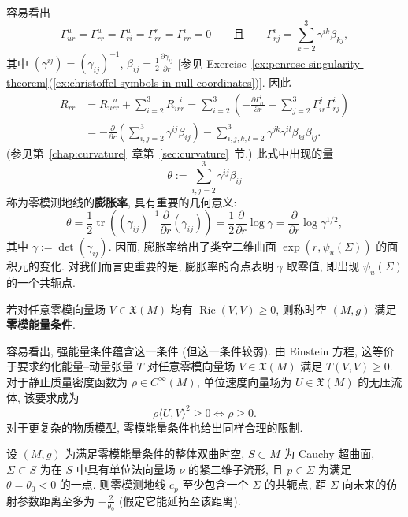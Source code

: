 容易看出
\[
  \Gamma^u_{ur}=\Gamma^u_{rr}=\Gamma^u_{ri}=\Gamma^r_{rr}=\Gamma^i_{rr}=0
  \qquad\text{且}\qquad\Gamma^i_{rj}=\sum_{k=2}^3\gamma^{ik}\beta_{kj},
\]
其中 $(\gamma^{ij})=(\gamma_{ij})^{-1}$, $\beta_{ij}=\frac12\frac{\partial\gamma_{ij}}{\partial r}$ [参见 Exercise~\ref{ex:penrose-singularity-theorem}(\ref{ex:christoffel-symbols-in-null-coordinates})]. 因此
\begin{align*}
  R_{rr}
  &=R_{urr}^{\ \ \ u}+\sum_{i=2}^3R_{irr}^{\ \ \ i}
    =\sum_{i=2}^3\left(-\frac{\partial\Gamma^i_{ir}}{\partial r}
                     -\sum_{j=2}^3\Gamma^j_{ir}\Gamma^i_{rj}\right)\\
  &=-\frac{\partial}{\partial r}\left(\sum_{i,j=2}^3\gamma^{ij}\beta_{ij}\right)
     -\sum_{i,j,k,l=2}^3\gamma^{jk}\gamma^{il}\beta_{ki}\beta_{lj}.
\end{align*}
(参见第~\ref{chap:curvature}~章第~\ref{sec:curvature}~节.) 此式中出现的量
\[
  \theta:=\sum_{i,j=2}^3\gamma^{ij}\beta_{ij}
\]
称为零模测地线的\textbf{膨胀率}, 具有重要的几何意义:
\[
  \theta=\frac{1}{2}\operatorname{tr}\left((\gamma_{ij})^{-1}
          \frac{\partial}{\partial r}(\gamma_{ij})\right)
       =\frac{1}{2}\frac{\partial}{\partial r}\log\gamma
       =\frac{\partial}{\partial r}\log\gamma^{1/2},
\]
其中 $\gamma:=\det(\gamma_{ij})$. 因而, 膨胀率给出了类空二维曲面 $\exp(r,\psi_u(\Sigma))$ 的面积元的变化. 对我们而言更重要的是, 膨胀率的奇点表明 $\gamma$ 取零值, 即出现 $\psi_u(\Sigma)$ 的一个共轭点.

\begin{RiemannDefinition}\label{def:null-energy-condition}
若对任意零模向量场 $V\in\mathfrak{X}(M)$ 均有 $\operatorname{Ric}(V,V)\geq0$, 则称时空 $(M,g)$ 满足\textbf{零模能量条件}.
\end{RiemannDefinition}

容易看出, 强能量条件蕴含这一条件 (但这一条件较弱). 由 Einstein 方程, 这等价于要求约化能量--动量张量 $T$ 对任意零模向量场 $V\in\mathfrak{X}(M)$ 满足 $T(V,V)\geq0$. 对于静止质量密度函数为 $\rho\in C^\infty(M)$, 单位速度向量场为 $U\in\mathfrak{X}(M)$ 的无压流体, 该要求成为
\[
  \rho\langle U,V\rangle^2\geq0\iff\rho\geq0.
\]
对于更复杂的物质模型, 零模能量条件也给出同样合理的限制.

\begin{RiemannProposition}\label{prop:null-focusing-under-null-energy-condition}
设 $(M,g)$ 为满足零模能量条件的整体双曲时空, $S\subset M$ 为 Cauchy 超曲面, $\Sigma\subset S$ 为在 $S$ 中具有单位法向量场 $\nu$ 的紧二维子流形, 且 $p\in\Sigma$ 为满足 $\theta=\theta_0<0$ 的一点. 则零模测地线 $c_p$ 至少包含一个 $\Sigma$ 的共轭点, 距 $\Sigma$ 向未来的仿射参数距离至多为 $-\frac{2}{\theta_0}$ (假定它能延拓至该距离).
\end{RiemannProposition}

